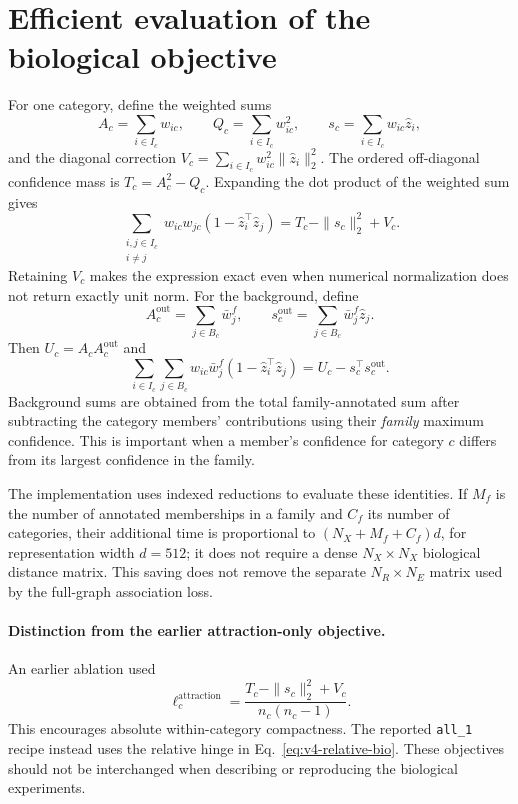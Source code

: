 \section{Efficient evaluation of the biological objective}
\label{app:v4-efficient-bio}
For one category, define the weighted sums
\begin{equation}
  A_c=\sum_{i\in I_c}w_{ic},\qquad
  Q_c=\sum_{i\in I_c}w_{ic}^{2},\qquad
  s_c=\sum_{i\in I_c}w_{ic}\hat z_i,
\end{equation}
and the diagonal correction
$V_c=\sum_{i\in I_c}w_{ic}^{2}\|\hat z_i\|_2^2$.
The ordered off-diagonal confidence mass is $T_c=A_c^2-Q_c$. Expanding the
dot product of the weighted sum gives
\begin{equation}
  \sum_{\substack{i,j\in I_c\\i\ne j}}
      w_{ic}w_{jc}(1-\hat z_i^\top\hat z_j)
       =T_c-\|s_c\|_2^2+V_c.
  \label{eq:v4-category-sum}
\end{equation}
Retaining $V_c$ makes the expression exact even when numerical normalization
does not return exactly unit norm. For the background, define
\begin{equation}
  A_c^{\mathrm{out}}=\sum_{j\in B_c}\bar w_j^f,\qquad
  s_c^{\mathrm{out}}=\sum_{j\in B_c}\bar w_j^f\hat z_j.
\end{equation}
Then $U_c=A_c A_c^{\mathrm{out}}$ and
\begin{equation}
  \sum_{i\in I_c}\sum_{j\in B_c}
      w_{ic}\bar w_j^f(1-\hat z_i^\top\hat z_j)
       =U_c-s_c^\top s_c^{\mathrm{out}}.
  \label{eq:v4-background-sum}
\end{equation}
Background sums are obtained from the total family-annotated sum after
subtracting the category members' contributions using their \emph{family}
maximum confidence. This is important when a member's confidence for category
$c$ differs from its largest confidence in the family.

The implementation uses indexed reductions to evaluate these identities.
If $M_f$ is the number of annotated memberships in a family and $C_f$ its
number of categories, their additional time is proportional to
$(N_X+M_f+C_f)d$, for representation width $d=512$; it does not require a
dense $N_X\times N_X$ biological distance matrix. This saving does not remove
the separate $N_R\times N_E$ matrix used by the full-graph association loss.

\paragraph{Distinction from the earlier attraction-only objective.}
An earlier ablation used
\begin{equation}
  \ell_c^{\mathrm{attraction}}=
    \frac{T_c-\|s_c\|_2^2+V_c}{n_c(n_c-1)}.
\end{equation}
This encourages absolute within-category compactness. The reported
\texttt{all\_1} recipe instead uses the relative hinge in
Eq.~\eqref{eq:v4-relative-bio}. These objectives should not be interchanged
when describing or reproducing the biological experiments.

